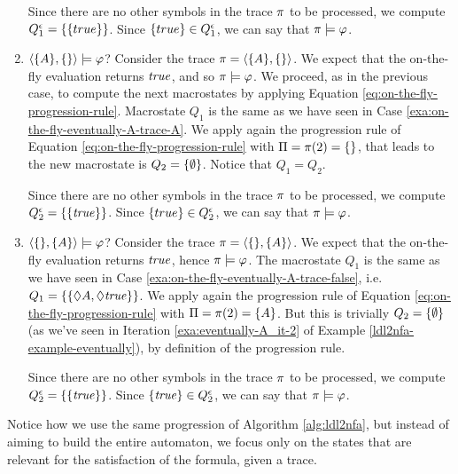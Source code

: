 \begin{example}
\begin{enumerate}
		Since there are no other symbols in the trace $\pi$ to be processed, we compute $Q_1^\epsilon = \{\{true\}\}$. Since $\{true\} \in Q_1^\epsilon$, we can say that $\pi \models \varphi$.\label{exa:on-the-fly-eventually-A-trace-A}
		
		\item $\langle \{A\}, \{\} \rangle \models \varphi$? Consider the trace $\pi = \langle \{A\}, \{\} \rangle$. We expect that the on-the-fly evaluation returns $\mathit{true}$, and so $\pi \models \varphi$. We proceed, as in the previous case, to compute the next macrostates by applying Equation \ref{eq:on-the-fly-progression-rule}. Macrostate $Q_1$ is the same as we have seen in Case \ref{exa:on-the-fly-eventually-A-trace-A}. 
		We apply again the progression rule of Equation \ref{eq:on-the-fly-progression-rule} with $\Pi = \pi(2) = \{\}$, that leads to the new macrostate is $Q_2 = \{\emptyset\}$. Notice that $Q_1 = Q_2$.
		
		Since there are no other symbols in the trace $\pi$ to be processed, we compute $Q_2^\epsilon = \{\{\mathit{true}\}\}$. Since $\{true\} \in Q_2^\epsilon$, we can say that $\pi \models \varphi$.
		
		\item \label{exa:on-the-fly-eventually-A-trace-false-A}$\langle \{\}, \{A\} \rangle \models \varphi$? Consider the trace $\pi = \langle \{\}, \{A\} \rangle$. We expect that the on-the-fly evaluation returns $\mathit{true}$, hence $\pi \models \varphi$. The macrostate $Q_1$ is the same as we have seen in Case \ref{exa:on-the-fly-eventually-A-trace-false}, i.e. $Q_1 = \{\{\Diamond A, \Diamond \mathit{true}\}\}$. 
		We apply again the progression rule of Equation \ref{eq:on-the-fly-progression-rule} with $\Pi = \pi(2) = \{A\}$. But this is trivially $Q_2 = \{\emptyset\}$ (as we've seen in Iteration \ref{exa:eventually-A_it-2} of Example \ref{ldl2nfa-example-eventually}), by definition of the progression rule.
		
		Since there are no other symbols in the trace $\pi$ to be processed, we compute $Q_2^\epsilon = \{\{\mathit{true}\}\}$. Since $\{\mathit{true}\} \in Q_2^\epsilon$, we can say that $\pi \models \varphi$.
		
	\end{enumerate}	
	Notice how we use the same progression  of Algorithm \ref{alg:ldl2nfa}, but instead of aiming to build the entire automaton, we focus only on the states that are relevant for the satisfaction of the formula, given a trace.
	
\end{example}

